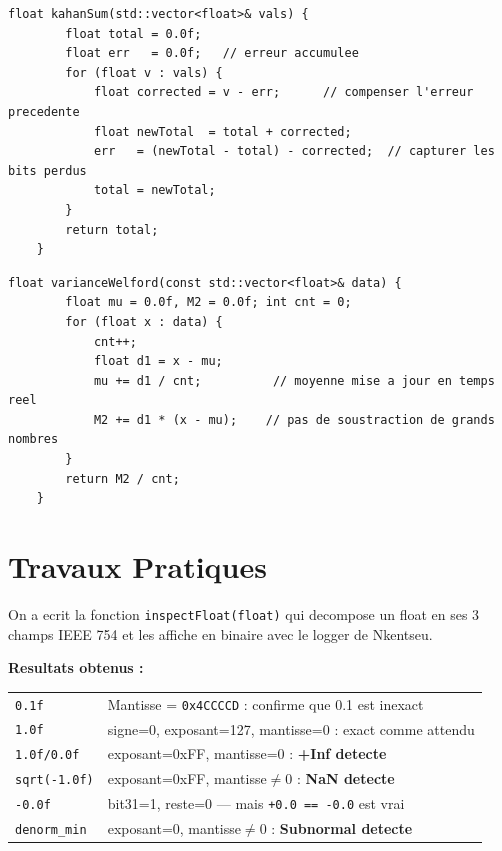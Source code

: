 \documentclass[12pt,a4paper]{report}
\newcommand{\code}[1]{\texttt{\textcolor{PrimaryBlue}{#1}}}
\begin{document}
\begin{lstlisting}[caption={Sommation de Kahan : compenser les bits perdus}]
    float kahanSum(std::vector<float>& vals) {
        float total = 0.0f;
        float err   = 0.0f;   // erreur accumulee
        for (float v : vals) {
            float corrected = v - err;      // compenser l'erreur precedente
            float newTotal  = total + corrected;
            err   = (newTotal - total) - corrected;  // capturer les bits perdus
            total = newTotal;
        }
        return total;
    }
\end{lstlisting}

\begin{lstlisting}[caption={Variance de Welford : stable numeriquement en une seule passe}]
    float varianceWelford(const std::vector<float>& data) {
        float mu = 0.0f, M2 = 0.0f; int cnt = 0;
        for (float x : data) {
            cnt++;
            float d1 = x - mu;
            mu += d1 / cnt;          // moyenne mise a jour en temps reel
            M2 += d1 * (x - mu);    // pas de soustraction de grands nombres
        }
        return M2 / cnt;
    }
\end{lstlisting}

\section{Travaux Pratiques}

\begin{tpbox}
On a ecrit la fonction \code{inspectFloat(float)} qui decompose un float en ses 3 champs IEEE 754 et les affiche en binaire avec le logger de Nkentseu.

\medskip
\textbf{Resultats obtenus :}

\begin{tabular}{@{}ll@{}}
  \code{0.1f}          & Mantisse = \code{0x4CCCCD} : confirme que 0.1 est inexact \\
  \code{1.0f}          & signe=0, exposant=127, mantisse=0 : exact comme attendu \\
  \code{1.0f/0.0f}     & exposant=0xFF, mantisse=0 : \textbf{+Inf detecte} \\
  \code{sqrt(-1.0f)}   & exposant=0xFF, mantisse$\neq$0 : \textbf{NaN detecte} \\
  \code{-0.0f}         & bit31=1, reste=0 --- mais \code{+0.0 == -0.0} est vrai \\
  \code{denorm\_min}   & exposant=0, mantisse$\neq$0 : \textbf{Subnormal detecte} \\
\end{tabular}
\end{tpbox}
\end{document}
